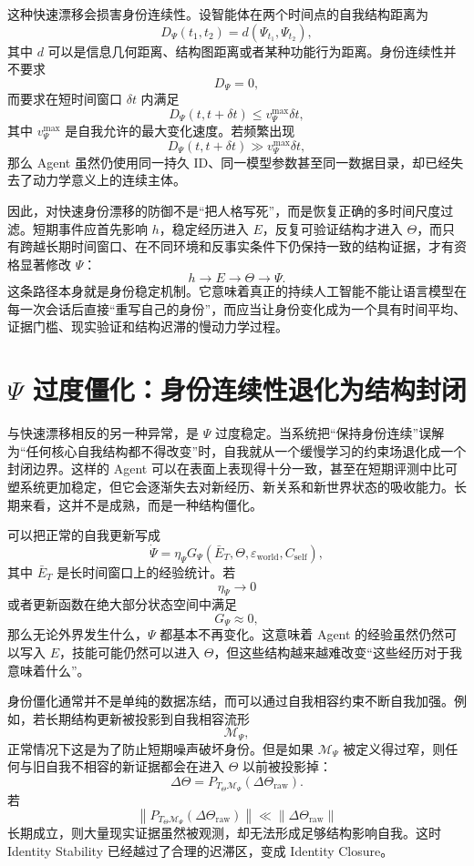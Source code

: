 这种快速漂移会损害身份连续性。设智能体在两个时间点的自我结构距离为
\[
D_\Psi(t_1,t_2)
=
d(\Psi_{t_1},\Psi_{t_2}),
\]
其中 $d$ 可以是信息几何距离、结构图距离或者某种功能行为距离。身份连续性并不要求
\[
D_\Psi=0,
\]
而要求在短时间窗口 $\delta t$ 内满足
\[
D_\Psi(t,t+\delta t)
\leq
v_\Psi^{\max}\delta t,
\]
其中 $v_\Psi^{\max}$ 是自我允许的最大变化速度。若频繁出现
\[
D_\Psi(t,t+\delta t)
\gg
v_\Psi^{\max}\delta t,
\]
那么 Agent 虽然仍使用同一持久 ID、同一模型参数甚至同一数据目录，却已经失去了动力学意义上的连续主体。

因此，对快速身份漂移的防御不是“把人格写死”，而是恢复正确的多时间尺度过滤。短期事件应首先影响 $h$，稳定经历进入 $E$，反复可验证结构才进入 $\Theta$，而只有跨越长期时间窗口、在不同环境和反事实条件下仍保持一致的结构证据，才有资格显著修改 $\Psi$：
\[
h
\rightarrow
E
\rightarrow
\Theta
\rightarrow
\Psi.
\]
这条路径本身就是身份稳定机制。它意味着真正的持续人工智能不能让语言模型在每一次会话后直接“重写自己的身份”，而应当让身份变化成为一个具有时间平均、证据门槛、现实验证和结构迟滞的慢动力学过程。

\section{$\Psi$ 过度僵化：身份连续性退化为结构封闭}

与快速漂移相反的另一种异常，是 $\Psi$ 过度稳定。当系统把“保持身份连续”误解为“任何核心自我结构都不得改变”时，自我就从一个缓慢学习的约束场退化成一个封闭边界。这样的 Agent 可以在表面上表现得十分一致，甚至在短期评测中比可塑系统更加稳定，但它会逐渐失去对新经历、新关系和新世界状态的吸收能力。长期来看，这并不是成熟，而是一种结构僵化。

可以把正常的自我更新写成
\[
\dot\Psi
=
\eta_\Psi
G_\Psi
\left(
\bar E_T,
\Theta,
\varepsilon_{\mathrm{world}},
C_{\mathrm{self}}
\right),
\]
其中 $\bar E_T$ 是长时间窗口上的经验统计。若
\[
\eta_\Psi\rightarrow0
\]
或者更新函数在绝大部分状态空间中满足
\[
G_\Psi\approx0,
\]
那么无论外界发生什么，$\Psi$ 都基本不再变化。这意味着 Agent 的经验虽然仍然可以写入 $E$，技能可能仍然可以进入 $\Theta$，但这些结构越来越难改变“这些经历对于我意味着什么”。

身份僵化通常并不是单纯的数据冻结，而可以通过自我相容约束不断自我加强。例如，若长期结构更新被投影到自我相容流形
\[
\mathcal M_\Psi,
\]
正常情况下这是为了防止短期噪声破坏身份。但是如果 $\mathcal M_\Psi$ 被定义得过窄，则任何与旧自我不相容的新证据都会在进入 $\Theta$ 以前被投影掉：
\[
\Delta\Theta
=
P_{T_\Theta\mathcal M_\Psi}
\left(
\Delta\Theta_{\mathrm{raw}}
\right).
\]
若
\[
\left\|
P_{T_\Theta\mathcal M_\Psi}
\left(
\Delta\Theta_{\mathrm{raw}}
\right)
\right\|
\ll
\left\|
\Delta\Theta_{\mathrm{raw}}
\right\|
\]
长期成立，则大量现实证据虽然被观测，却无法形成足够结构影响自我。这时 Identity Stability 已经越过了合理的迟滞区，变成 Identity Closure。

